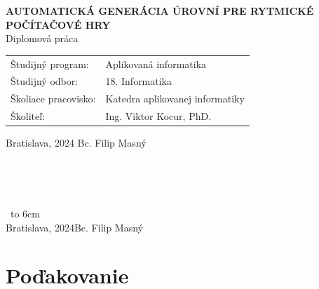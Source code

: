 \documentclass[12pt, oneside]{book}  %
\def\mftitle{Automatická Generácia Úrovní pre Rytmické Počítačové Hry}
\def\mfthesistype{Diplomová práca}
\def\mfauthor{Bc. Filip Masný}
\def\mfskolitel{Ing. Viktor Kocur, PhD.}
\def\mfplacedate{Bratislava, 2024}
\def\mfodbor{18. Informatika}
\def\program{Aplikovaná informatika}
\def\mfpracovisko{Katedra aplikovanej informatiky}
\begin{document}
\begin{center}
    \textbf{\MakeUppercase{\Large\mftitle}}\\
    \mfthesistype
\end{center}
\vfill


\begin{tabular}{l l}
    Študijný program:    & \program      \\
    Študijný odbor:      & \mfodbor      \\
    Školiace pracovisko: & \mfpracovisko \\
    Školiteľ:            & \mfskolitel   \\
\end{tabular}

\vfill
\noindent
\mfplacedate \hfill
\mfauthor
\cleardoublepage




\newpage
\thispagestyle{empty}

\newpage
\thispagestyle{empty}




{~}\vspace{12cm}

\noindent
\begin{minipage}{0.25\textwidth}~\end{minipage}
\thispagestyle{empty}
\begin{minipage}{0.75\textwidth}
    
\end{minipage}
\vfill
~\hfill {\hbox to 6cm{\dotfill}} \\
\mfplacedate \hfill \mfauthor
\vfill\eject \cleardoublepage




\newpage
\thispagestyle{empty}
\chapter*{Poďakovanie}\label{chap:thank_you}
\end{document}
